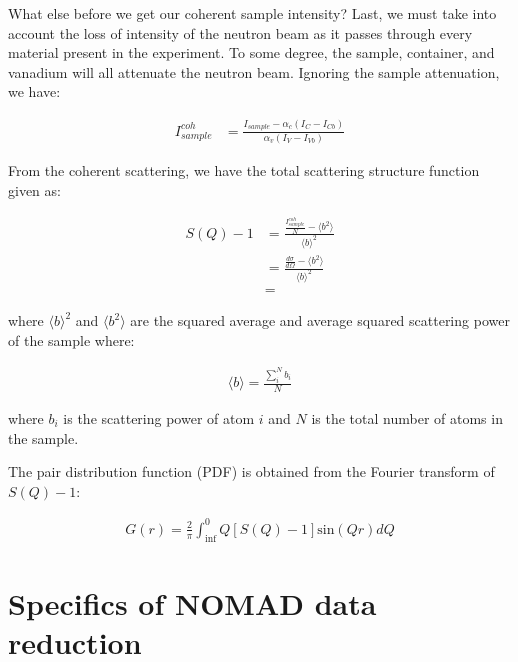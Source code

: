 What else before we get our coherent sample intensity? Last, we must take into account the loss of intensity of the neutron beam as it passes through every material present in the experiment. To some degree, the sample, container, and vanadium will all attenuate the neutron beam. Ignoring the sample attenuation, we have: 

\begin{equation} \label{eq_reduction}
\begin{split}
I_{sample}^{coh} & = \frac{I_{sample}-\alpha_c (I_{C}-I_{Cb})}{\alpha_v(I_{V}-I_{Vb})}  
\end{split}
\end{equation}

From the coherent scattering, we have the total scattering structure function given as:

\begin{equation} \label{eq_SofQ}
\begin{split}
S(Q) - 1 & = \frac {\frac{I_{sample}^{coh}}{N} - \langle b^2 \rangle }{{{\langle b \rangle}^2 }} \\
         & = \frac {\frac{d \sigma}{d \Omega}  - \langle b^2 \rangle }{{{\langle b \rangle}^2 }} \\
         & = 
\end{split}
\end{equation}

where ${\langle b \rangle}^2$ and $\langle b^2 \rangle$ are the squared average and average squared scattering power of the sample where:

\begin{equation} \label{eq_scattering_power}
\begin{split}
\langle b \rangle = \frac {\sum_{i}^{N} b_{i}}{N}
\end{split}
\end{equation}


where $b_i$ is the scattering power of atom $i$ and $N$ is the total number of atoms in the sample.

The pair distribution function (PDF) is obtained from the Fourier transform of $S(Q)-1$:

\begin{equation} \label{eq_GofR}
\begin{split}
G(r) = \frac{2}{\pi} \int_{\inf}^{0} Q [S(Q)-1] \text{sin}(Qr) dQ
\end{split}
\end{equation}

\section{Specifics of NOMAD data reduction}

